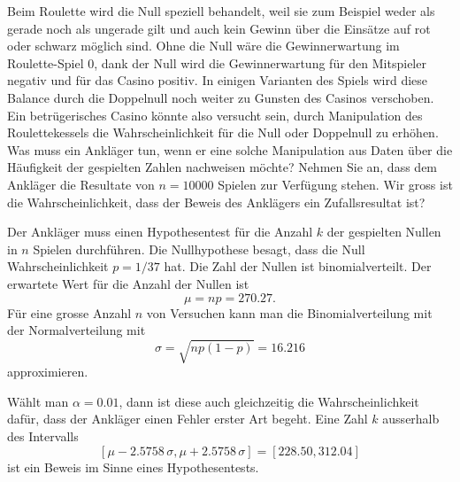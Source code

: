 Beim Roulette wird die Null speziell behandelt, weil sie zum Beispiel
weder als gerade noch als ungerade gilt und auch kein Gewinn über
die Einsätze auf rot oder schwarz möglich sind.
Ohne die Null wäre die Gewinnerwartung im Roulette-Spiel 0,
dank der Null wird die Gewinnerwartung für den Mitspieler negativ
und für das Casino positiv. 
In einigen Varianten des Spiels wird diese Balance durch die Doppelnull
noch weiter zu Gunsten des Casinos verschoben.
Ein betrügerisches Casino könnte also versucht sein, durch Manipulation
des Roulettekessels die Wahrscheinlichkeit für die Null oder Doppelnull
zu erhöhen.
Was muss ein Ankläger tun, wenn er eine solche Manipulation
aus Daten über die Häufigkeit der gespielten Zahlen nachweisen möchte?
Nehmen Sie an, dass dem Ankläger die Resultate von $n=10000$ Spielen
zur Verfügung stehen.
Wir gross ist die Wahrscheinlichkeit, dass der Beweis des Anklägers
ein Zufallsresultat ist?


\begin{loesung}
Der Ankläger muss einen Hypothesentest für die Anzahl $k$ der gespielten
Nullen in $n$ Spielen durchführen.
Die Nullhypothese besagt, dass die Null Wahrscheinlichkeit $p=1/37$ hat.
Die Zahl der Nullen ist binomialverteilt.
Der erwartete Wert für die Anzahl der Nullen ist
\[
\mu=np = 270.27.
\]
Für eine grosse Anzahl $n$ von Versuchen kann man die Binomialverteilung
mit der Normalverteilung mit
\[
\sigma
=
\sqrt{np(1-p)}
=
16.216
\]
approximieren.

Wählt man $\alpha=0.01$, dann ist diese auch gleichzeitig die
Wahrscheinlichkeit dafür, dass der Ankläger einen Fehler erster Art
begeht.
Eine Zahl $k$ ausserhalb des Intervalls
\[
[ \mu - 2.5758\,\sigma, \mu + 2.5758\,\sigma]
=
[228.50, 312.04]
\]
ist ein Beweis im Sinne eines Hypothesentests.
\end{loesung}



